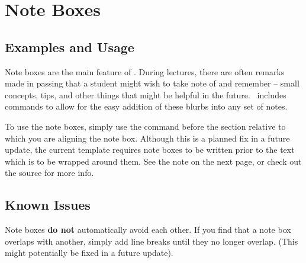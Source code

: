 \documentclass{ClassTeX}
\begin{document}
	\section{Note Boxes}
	
	\subsection{Examples and Usage}
		
	Note boxes are the main feature of \ClassTeX.  During lectures, there are often remarks made in passing that a student might wish to take note of and remember -- small concepts, tips, and other things that might be helpful in the future.  \ClassTeX\ includes commands to allow for the easy addition of these blurbs into any set of notes.\\

	To use the note boxes, simply use the command before the section relative to which you are aligning the note box.  Although this is a planned fix in a future update, the current template requires note boxes to be written prior to the text which is to be wrapped around them.  See the note on the next page, or check out the source for more info.\\
	
	
	\subsection{Known Issues}
	
	Note boxes \textbf{do not} automatically avoid each other.  If you find that a note box overlaps with another, simply add line breaks until they no longer overlap.  (This might potentially be fixed in a future update).
	
\end{document}
